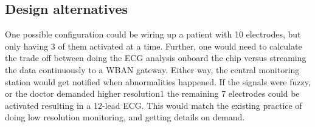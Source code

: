 
\subsection{Design alternatives} %
\label{sub:design_alternatives}

One possible configuration could be wiring up a patient with 10 electrodes, but only having 3 of them activated at a time. Further, one would need to calculate the trade off between doing the ECG analysis onboard the chip versus streaming the data continuously to a WBAN gateway. Either way, the central monitoring station would get notified when abnormalities happened. If the signals were fuzzy, or the doctor demanded higher resolution{1} the remaining 7 electrodes could be activated resulting in a 12-lead ECG. This would match the existing practice of doing low resolution monitoring, and getting details on demand.


